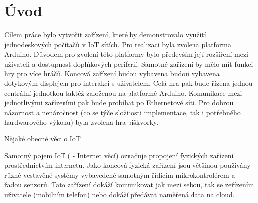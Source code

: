 \section{Úvod}
Cílem práce bylo vytvořit zařízení, které by demonstrovalo využití jednodeskových počítačů v IoT sítích. Pro realizaci byla zvolena platforma Arduino. Důvodem pro zvolení této platformy bylo především její rozšíření mezi uživateli a dostupnost doplňkových periferií. Samotné zařízení by mělo mít funkci hry pro více hráčů. Koncová zařízení budou vybavena budou vybavena dotykovým displejem pro interakci s uživatelem. Celá hra pak bude řízena jednou centrální jednotkou taktéž založenou na platformě Arduino. Komunikace mezi jednotlivými zařízeními pak bude probíhat po Ethernetové síti. Pro dobrou názornost a nenáročnost (co se týče složitosti implementace, tak i potřebného hardwarového výkonu) byla zvolena hra piškvorky.


{\color{ashgrey} Nějaké obecné věci o IoT}

Samotný pojem IoT ( - Internet věcí) označuje propojení fyzických zařízení prostřednictvím internetu. Jako koncová fyzická zařízení jsou většinou používány různé vestavěné systémy vybavedené samotným řídicím mikrokontrolérem a řadou senzorů. Tato zařízení dokáží komunikovat jak mezi sebou, tak se zeřízením uživatele (mobilním telefon) nebo dokáží předávat naměřená data na cloud.


\notFinished
